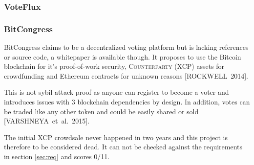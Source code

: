 \documentclass[9pt,oneside]{amsart}
\begin{document}
\begin{multicols}{2}
\subsubsection{VoteFlux}

\subsubsection{BitCongress}
BitCongress claims to be a decentralized voting platform but is lacking references or source code, a whitepaper is available though. It proposes to use the Bitcoin blockchain for it's proof-of-work security, \textsc{Counterparty (XCP)} assets for crowdfunding and Ethereum contracts for unknown reasons [ROCKWELL~2014].\par
This is not sybil attack proof as anyone can register to become a voter and introduces issues with 3 blockchain dependencies by design. In addition, votes can be traded like any other token and could be easily shared or sold [VARSHNEYA~et~al.~2015].\par
The initial XCP crowdsale never happened in two years and this project is therefore to be considered dead. It can not be checked against the requirements in section \ref{sec:req} and scores 0/11.


\end{multicols}
\end{document}
